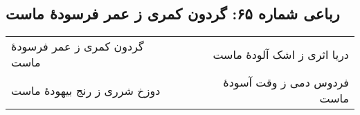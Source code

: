 \begin{center}
\section*{رباعی شماره ۶۵: گردون کمری ز عمر فرسودهٔ ماست}
\label{sec:sh065}
\begin{longtable}{l p{0.5cm} r}
گردون کمری ز عمر فرسودهٔ ماست
&&
دریا اثری ز اشک آلودهٔ ماست
\\
دوزخ شرری ز رنج بیهودهٔ ماست
&&
فردوس دمی ز وقت آسودهٔ ماست
\\
\end{longtable}
\end{center}
